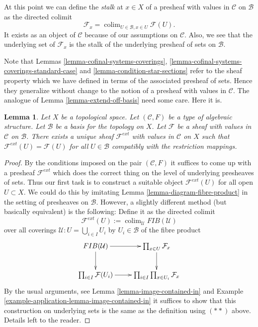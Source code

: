 \documentclass{stacks-project}
\theoremstyle{plain}
\newtheorem{lemma}[subsection]{Lemma}
\theoremstyle{definition}
\theoremstyle{remark}
\numberwithin{equation}{subsection}
\def\colim{\mathop{\mathrm{colim}}\nolimits}
\begin{document}
\noindent
At this point we can define the {\it stalk} at $x \in X$
of a presheaf with values in $\mathcal{C}$ on $\mathcal{B}$
as the directed colimit
$$
\mathcal{F}_x = \colim_{U\in \mathcal{B}, x\in U} \mathcal{F}(U).
$$
It exists as an object of $\mathcal{C}$
because of our assumptions on $\mathcal{C}$.
Also, we see that the underlying set of $\mathcal{F}_x$
is the stalk of the underlying presheaf of sets on $\mathcal{B}$.

\medskip\noindent
Note that Lemmas \ref{lemma-cofinal-systems-coverings},
\ref{lemma-cofinal-systems-coverings-standard-case} and
\ref{lemma-condition-star-sections} refer to the sheaf
property which we have defined in terms of the associated presheaf
of sets. Hence they generalize without change to the notion
of a presheaf with values in $\mathcal{C}$. The analogue of
Lemma \ref{lemma-extend-off-basis} need some care. Here it is.

\begin{lemma}
\label{lemma-extend-off-basis-structures}
Let $X$ be a topological space. Let $(\mathcal{C}, F)$ be
a type of algebraic structure.
Let $\mathcal{B}$ be a basis for the topology on $X$.
Let $\mathcal{F}$ be a sheaf with values in $\mathcal{C}$
on $\mathcal{B}$.
There exists a unique sheaf $\mathcal{F}^{ext}$ with values in $\mathcal{C}$
on $X$ such that $\mathcal{F}^{ext}(U) = \mathcal{F}(U)$
for all $U \in \mathcal{B}$ compatibly with the restriction
mappings.
\end{lemma}

\begin{proof}
By the conditions imposed on the pair $(\mathcal{C}, F)$ it
suffices to come up with a presheaf $\mathcal{F}^{ext}$
which does the correct thing on the level of underlying
presheaves of sets. Thus our first task is to construct
a suitable object $\mathcal{F}^{ext}(U)$ for all open $U \subset X$.
We could do this by imitating
Lemma \ref{lemma-diagram-fibre-product} in the setting
of presheaves on $\mathcal{B}$. However, a slightly different method
(but basically equivalent) is the following:
Define it as the directed colimit
$$
\mathcal{F}^{ext}(U)
:=
\colim_\mathcal{U} FIB(\mathcal{U})
$$
over all coverings
$\mathcal{U} : U = \bigcup_{i\in I} U_i$ by $U_i \in \mathcal{B}$
of the fibre product
$$
\xymatrix{
FIB(\mathcal{U}) \ar[r] \ar[d] &
\prod\nolimits_{x\in U} \mathcal{F}_x \ar[d] \\
\prod\nolimits_{i\in I} \mathcal{F}(U_i) \ar[r] &
\prod\nolimits_{i \in I} \prod\nolimits_{x\in U_i} \mathcal{F}_x
}
$$
By the usual arguments, see Lemma \ref{lemma-image-contained-in}
and Example \ref{example-application-lemma-image-contained-in}
it suffices to show that this construction on underlying
sets is the same as the definition using $(**)$ above.
Details left to the reader.
\end{proof}
\end{document}
